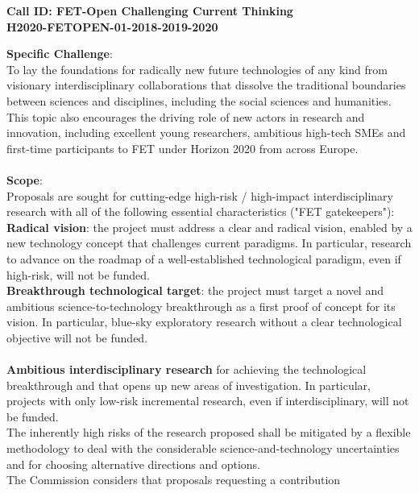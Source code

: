 \documentclass[english,12pt]{article}
\begin{document}
\begin{mybox}\begin{singlespace}
 {\bf{Call ID: FET-Open Challenging Current Thinking\\ H2020-FETOPEN-01-2018-2019-2020}}\\
 \begin{small}
   {\bf Specific Challenge}:\\
   To lay the foundations for radically new future technologies of any
   kind from visionary interdisciplinary collaborations that dissolve
   the traditional boundaries between sciences and disciplines,
   including the social sciences and humanities. This topic also
   encourages the driving role of new actors in research and
   innovation, including excellent young researchers, ambitious
   high-tech SMEs and first-time participants to FET under Horizon
   2020 from across Europe.\\
   \\
   {\bf Scope}:\\
   Proposals are sought for cutting-edge high-risk / high-impact
   interdisciplinary research with all of the following essential
   characteristics ("FET gatekeepers"):
   \\
   {\bf Radical vision}: the project must address a clear and radical
   vision, enabled by a new technology concept that challenges current
   paradigms. In particular, research to advance on the roadmap of a
   well-established technological paradigm, even if high-risk, will
   not be funded.
   \\
   {\bf Breakthrough technological target}: the project must target a novel
   and ambitious science-to-technology breakthrough as a first proof
   of concept for its vision. In particular, blue-sky exploratory
   research without a clear technological objective will not be
   funded.\\
   \\
   {\bf Ambitious interdisciplinary research} for achieving the
   technological breakthrough and that opens up new areas of
   investigation. In particular, projects with only low-risk
   incremental research, even if interdisciplinary, will not be
   funded.
   \\
   The inherently high risks of the research proposed shall be
   mitigated by a flexible methodology to deal with the considerable
   science-and-technology uncertainties and for choosing alternative
   directions and options.
   \\
   The Commission considers that proposals requesting a contribution

\end{small}
\end{singlespace}
\end{mybox}
\end{document}
